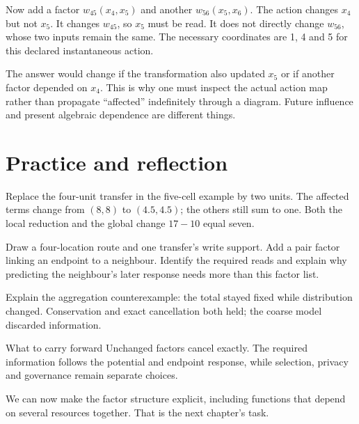Now add a factor $w_{45}(x_4,x_5)$ and another $w_{56}(x_5,x_6)$. The action changes $x_4$ but not $x_5$. It changes $w_{45}$, so $x_5$ must be read. It does not directly change $w_{56}$, whose two inputs remain the same. The necessary coordinates are 1, 4 and 5 for this declared instantaneous action.

The answer would change if the transformation also updated $x_5$ or if another factor depended on $x_4$. This is why one must inspect the actual action map rather than propagate ``affected'' indefinitely through a diagram. Future influence and present algebraic dependence are different things.

\section{Practice and reflection}
Replace the four-unit transfer in the five-cell example by two units. The affected terms change from $(8,8)$ to $(4.5,4.5)$; the others still sum to one. Both the local reduction and the global change $17-10$ equal seven.

Draw a four-location route and one transfer's write support. Add a pair factor linking an endpoint to a neighbour. Identify the required reads and explain why predicting the neighbour's later response needs more than this factor list.

Explain the aggregation counterexample: the total stayed fixed while distribution changed. Conservation and exact cancellation both held; the coarse model discarded information.

\begin{intuitionbox}{What to carry forward}
Unchanged factors cancel exactly. The required information follows the potential and endpoint response, while selection, privacy and governance remain separate choices.
\end{intuitionbox}

We can now make the factor structure explicit, including functions that depend on several resources together. That is the next chapter's task.
